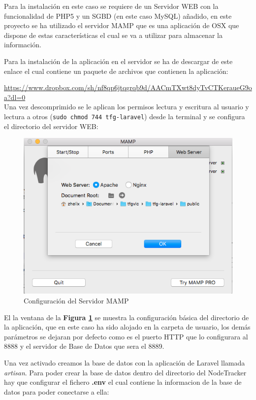 Para la instalación en este caso se requiere de un Servidor WEB con la funcionalidad de PHP5 y un SGBD (en este caso MySQL) añadido, en este proyecto se ha utilizado el servidor MAMP que es una aplicación de OSX que dispone de estas características el cual se va a utilizar para almacenar la información.

Para la instalación de la aplicación en el servidor se ha de descargar de este enlace el cual contiene un paquete de archivos que contienen la aplicación: 

\url{https://www.dropbox.com/sh/nf8qp6jtqgrqb9d/AACmTXwt8dyTvCTKeraueG9oa?dl=0}\\

Una vez descomprimido se le aplican los permisos lectura y escritura al usuario y lectura a otros (\texttt{sudo chmod 744 tfg-laravel}) desde la terminal y se configura el directorio del servidor WEB:

\begin{figure}[!h]
	\centering
	\includegraphics[width=0.7\linewidth]{figuras/confmamp}
	\caption{Configuración del Servidor MAMP}
	\label{fig:confmamp}
\end{figure}

El la ventana de la \textbf{Figura \ref{fig:confmamp}} se muestra la configuración básica del directorio de la aplicación, que en este caso ha sido alojado en la carpeta de usuario, los demás parámetros se dejaran por defecto como es el puerto HTTP que lo configurara al 8888 y el servidor de Base de Datos que sera el 8889.

Una vez activado creamos la base de datos con la aplicación de Laravel llamada \textit{artisan}. Para poder crear la base de datos dentro del directorio del NodeTracker hay que configurar el fichero \textbf{.env} el cual contiene la informacion de la base de datos para poder conectarse a ella:

